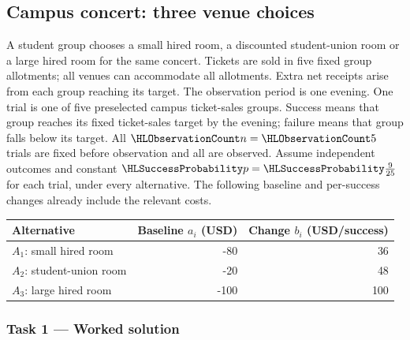 \subsection{Campus concert: three venue choices}\label{prob:fees}
\label{prob:c4-restaurant}
A student group chooses a small hired room, a discounted student-union room or a large hired room for the same concert. Tickets are sold in five fixed group allotments; all venues can accommodate all allotments. Extra net receipts arise from each group reaching its target.
The observation period is one evening. One trial is one of five preselected campus ticket-sales groups.
Success means that group reaches its fixed ticket-sales target by the evening; failure means that group falls below its target.
All $\TrialCount{n}=\TrialCount{5}$ trials are fixed before observation and all are observed.
Assume independent outcomes and constant $\SuccessProb{p}=\SuccessProb{\frac{9}{25}}$ for each trial, under every alternative.
The following baseline and per-success changes already include the relevant costs.
\begin{center}\begin{tabular}{lrr}\toprule Alternative & Baseline $a_i$ (USD) & Change $b_i$ (USD/success)\\\midrule
$A_1$: small hired room & -80 & 36\\
$A_2$: student-union room & -20 & 48\\
$A_3$: large hired room & -100 & 100\\
\bottomrule\end{tabular}\end{center}
\clearpage\subsubsection*{Task 1 --- Worked solution}\label{sol:c4-restaurant-model}
